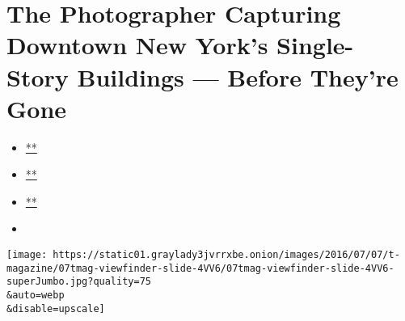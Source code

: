 \hypertarget{the-photographer-capturing-downtown-new-yorks-single-story-buildings--before-theyre-gone}{%
\section{The Photographer Capturing Downtown New York's Single-Story
Buildings --- Before They're
Gone}\label{the-photographer-capturing-downtown-new-yorks-single-story-buildings--before-theyre-gone}}

\begin{itemize}
\item
  \href{https://www.facebookcorewwwi.onion/sharer.php?app_id=9869919170\&u=https\%3A\%2F\%2Fwww.nytimes3xbfgragh.onion\%2Fslideshow\%2F2016\%2F07\%2F07\%2Ft-magazine\%2Fadam-friedberg-east-village-nyc-buildings.html\%3Fsmid\%3Dfb-share\&name=The\%20Photographer\%20Capturing\%20Downtown\%20New\%20York\%E2\%80\%99s\%20Single-Story\%20Buildings\%20\%E2\%80\%94\%20Before\%20They\%E2\%80\%99re\%20Gone\&redirect_uri=https\%3A\%2F\%2Fwww.facebookcorewwwi.onion\%2F}{**}
\item
  \href{https://twitter.com/intent/tweet?url=https\%3A\%2F\%2Fwww.nytimes3xbfgragh.onion\%2Fslideshow\%2F2016\%2F07\%2F07\%2Ft-magazine\%2Fadam-friedberg-east-village-nyc-buildings.html\%3Fsmid\%3Dtw-share\&text=The\%20Photographer\%20Capturing\%20Downtown\%20New\%20York\%E2\%80\%99s\%20Single-Story\%20Buildings\%20\%E2\%80\%94\%20Before\%20They\%E2\%80\%99re\%20Gone}{**}
\item
  \href{mailto:?subject=nytimes3xbfgragh.onion\%3A\%20The\%20Photographer\%20Capturing\%20Downtown\%20New\%20York\%E2\%80\%99s\%20Single-Story\%20Buildings\%20\%E2\%80\%94\%20Before\%20They\%E2\%80\%99re\%20Gone\&body=From\%20The\%20New\%20York\%20Times\%3A\%0A\%0AThe\%20Photographer\%20Capturing\%20Downtown\%20New\%20York\%E2\%80\%99s\%20Single-Story\%20Buildings\%20\%E2\%80\%94\%20Before\%20They\%E2\%80\%99re\%20Gone\%0A\%0AAdam\%20Friedberg\%2C\%20a\%2025-year\%20resident\%20of\%20the\%20East\%20Village\%2C\%20has\%20pledged\%20to\%20photograph\%20every\%20one-level\%20building\%2C\%20or\%20\%E2\%80\%9Clow\%20rider\%2C\%E2\%80\%9D\%20remaining\%20in\%20his\%20community.\%0A\%0Ahttps\%3A\%2F\%2Fwww.nytimes3xbfgragh.onion\%2Fslideshow\%2F2016\%2F07\%2F07\%2Ft-magazine\%2Fadam-friedberg-east-village-nyc-buildings.html\%3Fsmid\%3Dem-share}{**}
\item
\end{itemize}

\texttt{[image: https://static01.graylady3jvrrxbe.onion/images/2016/07/07/t-magazine/07tmag-viewfinder-slide-4VV6/07tmag-viewfinder-slide-4VV6-superJumbo.jpg?quality=75\\\&auto=webp\\\&disable=upscale]}

